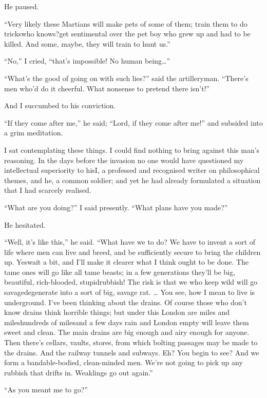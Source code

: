 He paused.

``Very likely these Martians will make pets of some of them; train
them to do tricks\dash{}who knows?\dash{}get sentimental over the pet boy who
grew up and had to be killed. And some, maybe, they will train to
hunt us.''

``No,'' I cried, ``that's impossible! No human being\ldots{}''

``What's the good of going on with such lies?'' said the
artilleryman. ``There's men who'd do it cheerful. What nonsense to
pretend there isn't!''

And I succumbed to his conviction.

``If they come after me,'' he said; ``Lord, if they come after me!''
and subsided into a grim meditation.

I sat contemplating these things. I could find nothing to bring
against this man's reasoning. In the days before the invasion no
one would have questioned my intellectual superiority to his\dash{}I, a
professed and recognised writer on philosophical themes, and he, a
common soldier; and yet he had already formulated a situation that
I had scarcely realised.

``What are you doing?'' I said presently. ``What plans have you
made?''

He hesitated.

``Well, it's like this,'' he said. ``What have we to do? We have to
invent a sort of life where men can live and breed, and be
sufficiently secure to bring the children up. Yes\dash{}wait a bit, and
I'll make it clearer what I think ought to be done. The tame ones
will go like all tame beasts; in a few generations they'll be big,
beautiful, rich-blooded, stupid\dash{}rubbish! The risk is that we who
keep wild will go savage\dash{}degenerate into a sort of big, savage
rat. \ldots{} You see, how I mean to live is underground. I've been
thinking about the drains. Of course those who don't know drains
think horrible things; but under this London are miles and
miles\dash{}hundreds of miles\dash{}and a few days rain and London empty will
leave them sweet and clean. The main drains are big enough and airy
enough for anyone. Then there's cellars, vaults, stores, from which
bolting passages may be made to the drains. And the railway tunnels
and subways. Eh? You begin to see? And we form a band\dash{}able-bodied,
clean-minded men. We're not going to pick up any rubbish that
drifts in. Weaklings go out again.''

``As you meant me to go?''

